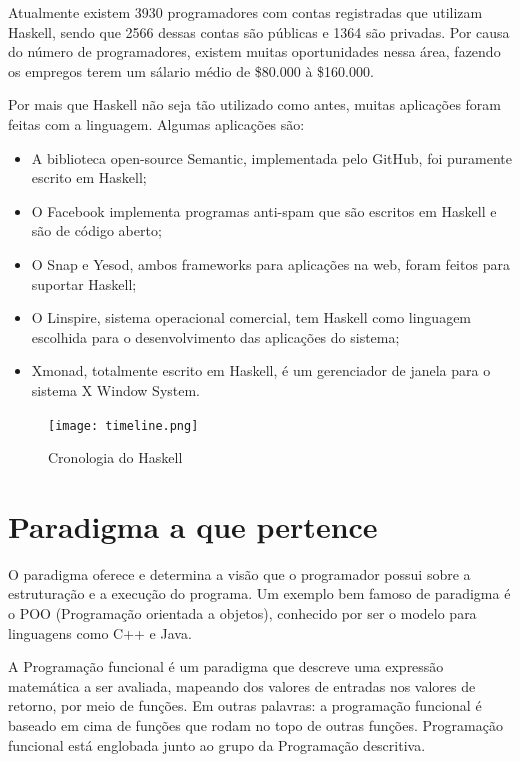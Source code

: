 \documentclass[
  12pt,				         %
  oneside,			       %
  a4paper,			       %
  english,		       	 %
  brazil,			      	 %
]{abntex2}
\begin{document}
    Atualmente existem 3930 programadores com contas registradas que utilizam Haskell, sendo que 2566
    dessas contas são públicas e 1364 são privadas. Por causa do número de programadores, existem muitas 
    oportunidades nessa área, fazendo os empregos terem um sálario médio de \$80.000 à \$160.000.

    Por mais que Haskell não seja tão utilizado como antes, muitas aplicações foram feitas com a linguagem. 
    Algumas aplicações são:

    \begin{itemize}
      \item A biblioteca open-source Semantic, implementada pelo GitHub, foi puramente escrito em Haskell;
      \item O Facebook implementa programas anti-spam que são escritos em Haskell e são de código aberto;
      \item O Snap e Yesod, ambos frameworks para aplicações na web, foram feitos para suportar Haskell;
      \item O Linspire, sistema operacional comercial, tem Haskell como linguagem escolhida para o desenvolvimento das aplicações do sistema;
      \item Xmonad, totalmente escrito em Haskell, é um gerenciador de janela para o sistema X Window System.
    \end{itemize}

    \begin{figure}[ht]
      \texttt{[image: timeline.png]}
      \caption{Cronologia do Haskell}
    \end{figure}

    \nocite{haskellmicrosoft}
    \nocite{haskellreport2010}
    \nocite{haskelljobs}
    \nocite{haskellers}

    \newpage

    \chapter{Paradigma a que pertence}

    O paradigma oferece e determina a visão que o programador possui sobre a estruturação
    e a execução do programa. Um exemplo bem famoso de paradigma é o POO (Programação orientada a objetos),
    conhecido por ser o modelo para linguagens como C++ e Java.

    A Programação funcional é um paradigma que descreve uma expressão matemática a ser avaliada,
    mapeando dos valores de entradas nos valores de retorno, por meio de funções. Em outras palavras: 
    a programação funcional é baseado em cima de funções que rodam no topo de outras funções. Programação 
    funcional está englobada junto ao grupo da Programação descritiva.
\end{document}
